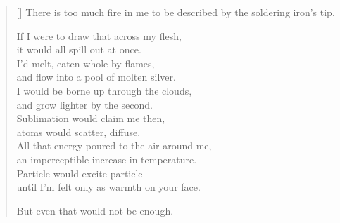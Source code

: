 \begin{verse}[\textwidth]
  There is too much fire in me to be described by the soldering iron's tip.

  If I were to draw that across my flesh,\\
  \vin it would all spill out at once.\\
  I'd melt, eaten whole by flames,\\
  \vin and flow into a pool of molten silver.\\
  I would be borne up through the clouds,\\
  \vin and grow lighter by the second.\\
  Sublimation would claim me then,\\
  \vin atoms would scatter, diffuse.\\
  All that energy poured to the air around me,\\
  \vin an imperceptible increase in temperature.\\
  Particle would excite particle\\
  \vin until I'm felt only as warmth on your face.

  But even that would not be enough.
\end{verse}
